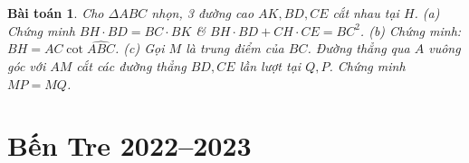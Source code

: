 \documentclass{article}
\newtheorem{baitoan}{Bài toán}
\begin{document}
\begin{baitoan}
	Cho $\Delta ABC$ nhọn, 3 đường cao $AK,BD,CE$ cắt nhau tại $H$. (a) Chứng minh $BH\cdot BD = BC\cdot BK$ \& $BH\cdot BD + CH\cdot CE = BC^2$. (b) Chứng minh: $BH = AC\cot\widehat{ABC}$. (c) Gọi $M$ là trung điểm của $BC$. Đường thẳng qua $A$ vuông góc với $AM$ cắt các đường thẳng $BD,CE$ lần lượt tại $Q,P$. Chứng minh $MP = MQ$.
\end{baitoan}


\section{Bến Tre 2022--2023}


\printbibliography[heading=bibintoc]
\end{document}
